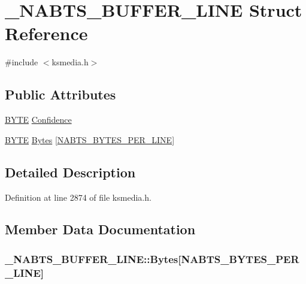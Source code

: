 \hypertarget{struct___n_a_b_t_s___b_u_f_f_e_r___l_i_n_e}{}\section{\+\_\+\+N\+A\+B\+T\+S\+\_\+\+B\+U\+F\+F\+E\+R\+\_\+\+L\+I\+NE Struct Reference}
\label{struct___n_a_b_t_s___b_u_f_f_e_r___l_i_n_e}


{\ttfamily \#include $<$ksmedia.\+h$>$}

\subsection*{Public Attributes}
\begin{DoxyCompactItemize}
\item 
\hyperlink{mapinls_8h_a4ae1dab0fb4b072a66584546209e7d58}{B\+Y\+TE} \hyperlink{struct___n_a_b_t_s___b_u_f_f_e_r___l_i_n_e_a63861f61dda193ee9c1c3c691f674ec5}{Confidence}
\item 
\hyperlink{mapinls_8h_a4ae1dab0fb4b072a66584546209e7d58}{B\+Y\+TE} \hyperlink{struct___n_a_b_t_s___b_u_f_f_e_r___l_i_n_e_a42bc783a1c66eefd9ca55a5bc54918a7}{Bytes} \mbox{[}\hyperlink{ksmedia_8h_a2b6b12305efcc6660945a025f12cb194}{N\+A\+B\+T\+S\+\_\+\+B\+Y\+T\+E\+S\+\_\+\+P\+E\+R\+\_\+\+L\+I\+NE}\mbox{]}
\end{DoxyCompactItemize}


\subsection{Detailed Description}


Definition at line 2874 of file ksmedia.\+h.



\subsection{Member Data Documentation}
\subsubsection[{\texorpdfstring{Bytes}{Bytes}}]{ \+\_\+\+N\+A\+B\+T\+S\+\_\+\+B\+U\+F\+F\+E\+R\+\_\+\+L\+I\+N\+E\+::\+Bytes\mbox{[}{\bf N\+A\+B\+T\+S\+\_\+\+B\+Y\+T\+E\+S\+\_\+\+P\+E\+R\+\_\+\+L\+I\+NE}\mbox{]}}\hypertarget{struct___n_a_b_t_s___b_u_f_f_e_r___l_i_n_e_a42bc783a1c66eefd9ca55a5bc54918a7}{}\label{struct___n_a_b_t_s___b_u_f_f_e_r___l_i_n_e_a42bc783a1c66eefd9ca55a5bc54918a7}


